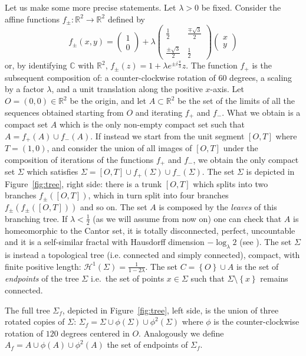 \documentclass{amsart}
\newcommand{\RR}{\mathbb R}
\newcommand{\CC}{\mathbb C}
\renewcommand{\H}{\mathcal H}
\newcommand{\ENCLOSE}[1]{\left\{#1\right\}}
\renewcommand{\H}{\mathcal{H}}
\theoremstyle{definition}
\theoremstyle{remark}
\begin{document}
Let us make some more precise statements.
Let $\lambda>0$ be fixed.
Consider the affine functions $f_\pm\colon \RR^2\to \RR^2$ defined by
\[
  f_\pm(x,y) = \begin{pmatrix} 1 \\ 0 \end{pmatrix} 
    + \lambda \begin{pmatrix} 
        \frac 1 2 & \frac{\mp\sqrt 3}{2} \\\\ 
        \frac{\pm\sqrt 3}{2} & \frac 1 2 
      \end{pmatrix} \begin{pmatrix} x \\ y \end{pmatrix}
\]
or, by identifying $\CC$ with $\RR^2$,
$f_\pm(z) = 1 + \lambda e^{\pm i \frac \pi 3} z$.
The function $f_+$ is the subsequent composition of: a counter-clockwise rotation of $60$ degrees,
a scaling by a factor $\lambda$, and a unit translation along the positive $x$-axis.
Let $O=(0,0)\in \RR^2$ be the origin, and let $A\subset \RR^2$ be the set of 
the limits of all the sequences obtained starting from $O$ and 
iterating $f_+$ and $f_-$.
What we obtain is a compact set $A$ which is the only non-empty compact set 
such that $A=f_+(A)\cup f_-(A)$.
If instead we start from the unit segment $[O,T]$ where $T=(1,0)$, and 
consider the union of all images of $[O,T]$ under the composition of iterations of the 
functions $f_+$ and $f_-$, we obtain the only compact set $\Sigma$ which satisfies 
$\Sigma=[O,T]\cup f_+(\Sigma)\cup f_-(\Sigma)$.
The set $\Sigma$ is depicted in Figure~\ref{fig:tree}, right side:
there is a trunk $[O,T]$ which splits into two branches $f_\pm([O,T])$, 
which in turn split into four branches $f_\pm(f_\pm([O,T]))$ and so on.
The set $A$ is composed by the \emph{leaves} of this branching tree.
If $\lambda < \frac 1 2$ (as we will assume from now on)
one can check that $A$ is 
homeomorphic to the Cantor set, it is totally disconnected, 
perfect, uncountable and it is a self-similar fractal with Hausdorff dimension
$-\log_\lambda 2$ (see \cite{Hut81}).
The set $\Sigma$ is instead a topological tree (i.e.{} connected and simply connected), 
compact, with finite positive length: $\H^1(\Sigma) = \frac{1}{1-2\lambda}$.
The set $C=\ENCLOSE{O}\cup A$ is the set of \emph{endpoints} of the tree $\Sigma$ i.e.\ 
the set of points $x\in \Sigma$ such that $\Sigma\setminus\ENCLOSE{x}$ remains connected.

The full tree $\Sigma_f$, depicted in Figure~\ref{fig:tree}, left side,
is the union of three rotated copies of $\Sigma$: $\Sigma_f = \Sigma \cup \phi(\Sigma) \cup \phi^2(\Sigma)$
where $\phi$ is the counter-clockwise rotation of $120$ degrees centered in $O$.
Analogously we define $A_f = A \cup \phi(A) \cup \phi^2(A)$ the set of endpoints of $\Sigma_f$.
\end{document}
